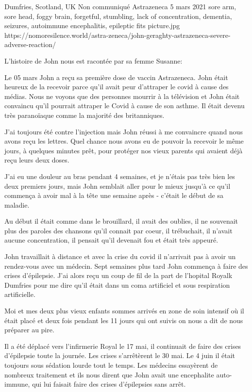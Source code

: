 {Dumfries, Scotland, UK}
{Non communiqué}
{Astrazeneca}
{5 mars 2021}
{sore arm, sore head, foggy brain, forgetful, stumbling, lack of concentration, dementia, seizures, autoimmune encephalitis, epileptic fits}
{picture.jpg}
{https://nomoresilence.world/astra-zeneca/john-geraghty-astrazeneca-severe-adverse-reaction/}
{

\normalsize

L'histoire de John nous est racontée par sa femme Susanne:

Le 05 mars John a reçu sa première dose de vaccin Astrazeneca. John était
heureux de la recevoir parce qu'il avait peur d'attraper le covid à cause des
médias. Nous ne voyons que des personnes mourrir à la télévision et John était
convaincu qu'il pourrait attraper le Covid à cause de son asthme. Il était
devenu très paranoïaque comme la majorité des britanniques.

J'ai toujours été contre l'injection mais John réussi à me convaincre quand nous
avons reçu les lettres. Quel chance nous avons eu de pouvoir la recevoir le même
jours, à quelques minutes prêt, pour protéger nos vieux parents qui avaient déjà
reçu leurs deux doses.

J'ai eu une douleur au bras pendant 4 semaines, et je n'étais pas très bien les
deux premiers jours, mais John semblait aller pour le mieux jusqu'à ce qu'il
commença à avoir mal à la tête une semaine après - c'était le début de sa
maladie.

Au début il était comme dans le brouillard, il avait des oublies, il ne
souvenait plus des paroles des chansons qu'il connait par coeur, il trébuchait,
il n'avait aucune concentration, il pensait qu'il devenait fou et était très
appeuré.

John travaillait à distance et avec la crise du covid il n'arrivait pas à avoir
un rendez-vous avec un médecin. Sept semaines plus tard John commença à faire
des crises d'épilepsie. J'ai alors reçu un coup de fil de la part de l'hopital
Royalk Dumfries pour me dire qu'il était dans un coma artificiel et sous
respiration artificielle.

Moi et mes deux plus vieux enfants sommes arrivés en zone de soin intensif où il
était placé et deux fois pendant les 11 jours qui ont suivis on nous a dit de
nous préparer au pire.

Il a été déplacé vers l'infirmerie Royal le 17 mai, il continuait de faire des
crises d'épilepsie toute la journée. Les crises s'arrêtèrent le 30 mai. Le 4
juin il était toujours sous sédation lourde tout le temps. Les médecins
essayèrent de nombreux traitement et ils nous dirent que John avait une
encephalite auto-immune, qui lui faisait faire des crises d'épilepsies sans
arrêt.

}
